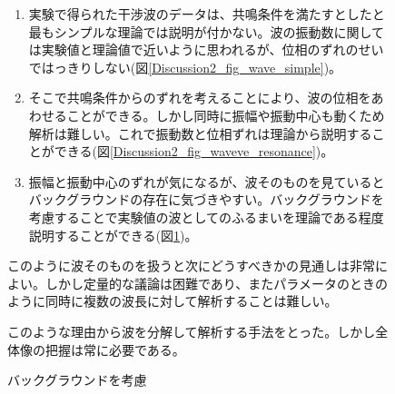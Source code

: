 \begin{figure}[h]
\begin{minipage}{0.49\hsize}
\caption{バックグラウンドを考慮}\label{Discussion2_fig_wave_background}
\end{minipage}
\hspace{2mm}
\begin{minipage}{0.49\hsize}
\begin{enumerate}
\item 実験で得られた干渉波のデータは、共鳴条件を満たすとしたと最もシンプルな理論では説明が付かない。波の振動数に関しては実験値と理論値で近いように思われるが、位相のずれのせいではっきりしない(図\ref{Discussion2_fig_wave_simple})。
\item そこで共鳴条件からのずれを考えることにより、波の位相をあわせることができる。しかし同時に振幅や振動中心も動くため解析は難しい。これで振動数と位相ずれは理論から説明することができる(図\ref{Discussion2_fig_waveve_resonance})。
\item 振幅と振動中心のずれが気になるが、波そのものを見ているとバックグラウンドの存在に気づきやすい。バックグラウンドを考慮することで実験値の波としてのふるまいを理論である程度説明することができる(図\ref{Discussion2_fig_wave_background})。
\end{enumerate}
このように波そのものを扱うと次にどうすべきかの見通しは非常によい。しかし定量的な議論は困難であり、またパラメータのときのように同時に複数の波長に対して解析することは難しい。

このような理由から波を分解して解析する手法をとった。しかし全体像の把握は常に必要である。
\vspace{4.5cm}
\end{minipage}
\end{figure}

